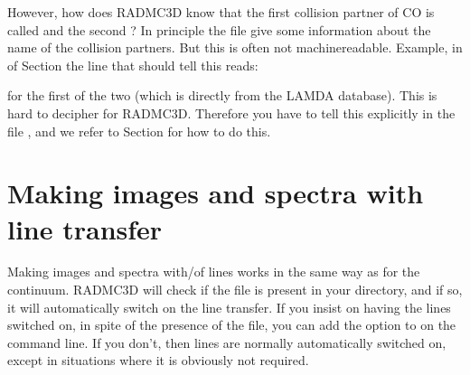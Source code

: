 \documentclass[letterpaper,10pt,english]{sphinxmanual}
\begin{document}
However, how does RADMC\sphinxhyphen{}3D know that the first collision partner of CO is called
 and the second ?  In principle the file 
give some information about the name of the collision partners. But this is
often not machine\sphinxhyphen{}readable.  Example, in  of Section
{\hyperref[\detokenize{lineradtrans:sec-molecule-xxx-inp}]{}} the line that should tell this reads:

\begin{sphinxVerbatim}[commandchars=\\\{\}]
           
\end{sphinxVerbatim}

for the first of the two
(which is directly from the LAMDA database).  This is hard to decipher for
RADMC\sphinxhyphen{}3D. Therefore you have to tell this explicitly in the file ,
and we refer to Section {\hyperref[\detokenize{lineradtrans:sec-line-dot-inp}]{}} for how to do this.


\section{Making images and spectra with line transfer}
\label{\detokenize{lineradtrans:making-images-and-spectra-with-line-transfer}}
Making images and spectra with/of lines works in the same way as for the
continuum. RADMC\sphinxhyphen{}3D will check if the file  is present in your
directory, and if so, it will automatically switch on the line transfer. If you
insist on  having the lines switched on, in spite of the presence of the
 file, you can add the option  to  on the
command line. If you don’t, then lines are normally automatically switched on,
except in situations where it is obviously not required.
\end{document}

